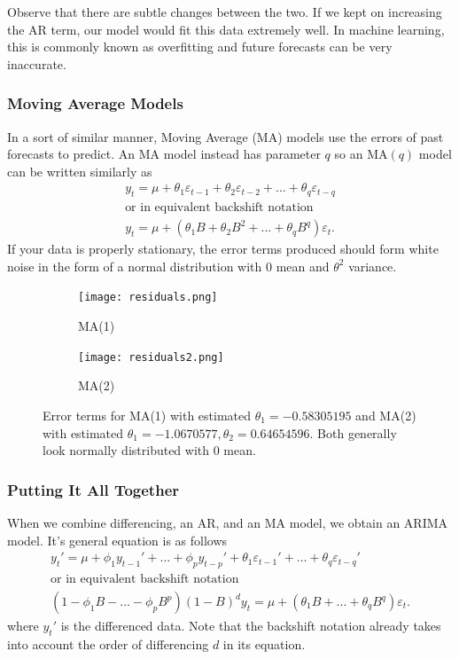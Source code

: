 \documentclass{article}
\begin{document}
    Observe that there are subtle changes between the two. If we kept on increasing the AR term, our model would fit this data extremely well. In machine learning, this is commonly known as overfitting and future forecasts can be very inaccurate.

  \subsubsection{Moving Average Models}
    In a sort of similar manner, Moving Average (MA) models use the errors of past forecasts to predict. An MA model instead has parameter $q$ so an MA$(q)$ model can be written similarly as
    \begin{gather*}
      y_t = \mu + \theta_1 \varepsilon_{t-1} + \theta_2 \varepsilon_{t-2} + ... + \theta_q \varepsilon_{t-q}\\
      \text{or in equivalent backshift notation}\\
      y_t = \mu + (\theta_1B + \theta_2B^2 + ... + \theta_qB^q)\varepsilon_t.
    \end{gather*}
    If your data is properly stationary, the error terms produced should form white noise in the form of a normal distribution with $0$ mean and $\theta^2$ variance.

    \begin{figure}[H]
      \centering
      \captionsetup{justification=centering}
      \begin{subfigure}[b]{0.49\linewidth}
        \texttt{[image: residuals.png]}
        \caption{MA(1)}
      \end{subfigure}
      \begin{subfigure}[b]{0.49\linewidth}
        \texttt{[image: residuals2.png]}
        \caption{MA(2)}
      \end{subfigure}
      \caption{Error terms for MA(1) with estimated $\theta_1 = -0.58305195$ and MA(2) with estimated $\theta_1 = -1.0670577, \theta_2 = 0.64654596$. Both generally look normally distributed with 0 mean.}
    \end{figure}

  \subsubsection{Putting It All Together}
  When we combine differencing, an AR, and an MA model, we obtain an ARIMA model. It's general equation is as follows
  \begin{gather*}
    y_t' = \mu + \phi_1 y_{t-1}' + ... + \phi_p y_{t-p}' + \theta_1 \varepsilon_{t-1}' + ... + \theta_q \varepsilon_{t-q}'\\
    \text{or in equivalent backshift notation}\\
    (1 - \phi_1B - ... - \phi_pB^p)(1-B)^dy_t = \mu + (\theta_1B + ... + \theta_qB^q)\varepsilon_t.
  \end{gather*}
  where $y_t'$ is the differenced data. Note that the backshift notation already takes into account the order of differencing $d$ in its equation.
\end{document}
